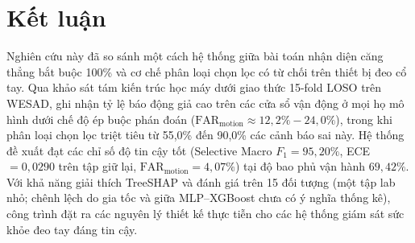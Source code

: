\documentclass[conference]{IEEEtran}
\begin{document}
\section{Kết luận}
Nghiên cứu này đã so sánh một cách hệ thống giữa bài toán nhận diện căng thẳng bắt buộc 100\% và cơ chế phân loại chọn lọc có từ chối trên thiết bị đeo cổ tay. Qua khảo sát tám kiến trúc học máy dưới giao thức 15-fold LOSO trên WESAD, ghi nhận tỷ lệ báo động giả cao trên các cửa sổ vận động ở mọi họ mô hình dưới chế độ ép buộc phán đoán ($\text{FAR}_{\text{motion}} \approx 12,2\% - 24,0\%$), trong khi phân loại chọn lọc triệt tiêu từ 55,0\% đến 90,0\% các cảnh báo sai này. Hệ thống đề xuất đạt các chỉ số độ tin cậy tốt (Selective Macro $F_1 = 95,20\%$, ECE $= 0,0290$ trên tập giữ lại, $\text{FAR}_{\text{motion}} = 4,07\%$) tại độ bao phủ vận hành $69,42\%$. Với khả năng giải thích TreeSHAP và đánh giá trên 15 đối tượng (một tập lab nhỏ; chênh lệch do gia tốc và giữa MLP--XGBoost chưa có ý nghĩa thống kê), công trình đặt ra các nguyên lý thiết kế thực tiễn cho các hệ thống giám sát sức khỏe đeo tay đáng tin cậy.
\end{document}
